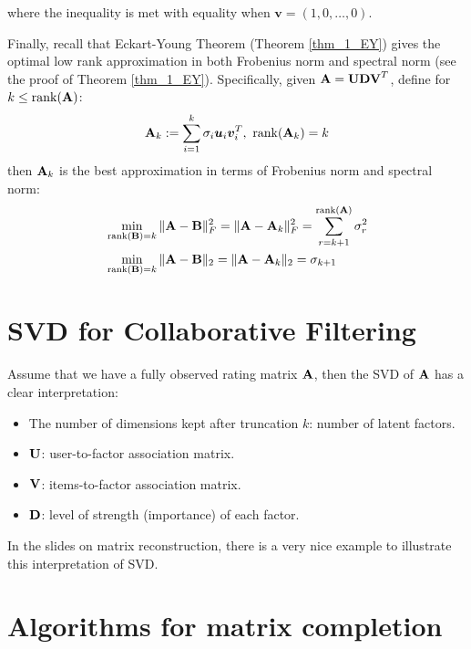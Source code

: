 \documentclass[../book-template.tex]{subfiles}
\begin{document}
where the inequality is met with equality when $\bm{v} = (1,0,\dots,0)$.
\par Finally, recall that Eckart-Young Theorem (Theorem \ref{thm_1_EY}) gives the optimal low rank approximation in both Frobenius norm and spectral norm (see the proof of Theorem \ref{thm_1_EY}). Specifically, given ${\bf A}={\bf UDV}^T$, define for $k\leq \operatorname{rank}({\bf A})$:
\begin{equation*}
	{\bf A}_k :=\sum_{i=1}^{k}\sigma_i \bm{u}_i\bm{v}_i^T,\ \operatorname{rank}({\bf A}_k)=k
\end{equation*}
then ${\bf A}_k$ is the best approximation in terms of Frobenius norm and spectral norm:
\begin{align*}
	&\min_{\operatorname{rank}({\bf B})=k}\|{\bf A}-{\bf B}\|^2_F=\|{\bf A}-{\bf A}_k\|_F^2=\sum_{r=k+1}^{\operatorname{rank}({\bf A})} \sigma_r^2\\
	&\min_{\operatorname{rank}({\bf B})=k}\|{\bf A}-{\bf B}\|_2=\|{\bf A}-{\bf A}_k\|_2=\sigma_{k+1}
\end{align*}

\section{SVD for Collaborative Filtering}
Assume that we have a fully observed rating matrix ${\bf A}$, then the SVD of ${\bf A}$ has a clear interpretation:
\begin{itemize}
	\item The number of dimensions kept after truncation $k$: number of latent factors.
	\item ${\bf U}$: user-to-factor association matrix.
	\item ${\bf V}$: items-to-factor association matrix.
	\item ${\bf D}$: level of strength (importance) of each factor.
\end{itemize} 
In the slides on matrix reconstruction, there is a very nice example to illustrate this interpretation of SVD.

\section{Algorithms for matrix completion}\label{sec_3_alg_for_mc}
\end{document}
